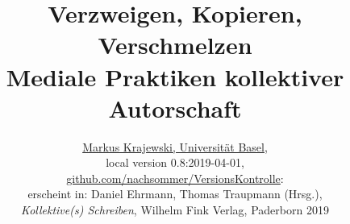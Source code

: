\documentclass[a4paper,11pt]{article}
\date{}
\newcommand{\anf}[1]{»#1«}
\begin{document}
%
% 
\title{Verzweigen, Kopieren, Verschmelzen\\
\Large Mediale Praktiken kollektiver Autorschaft}
\author{\href{http://gtm.mewi.unibas.ch}{Markus Krajewski, Universität Basel},\\[3mm]
local version 0.8:2019-04-01,\\
\href{https://github.com/nachsommer/VersionsKontrolle/tree/master/1.Fassung}{github.com/nachsommer/VersionsKontrolle}: \gitVer{}\\[3mm]
erscheint in: Daniel Ehrmann, Thomas Traupmann (Hrsg.),\\
\emph{Kollektive(s) Schreiben}, Wilhelm Fink Verlag, Paderborn 2019}
\maketitle
\tableofcontents
\newpage
%
\begin{comment}

Am Ende, nachdem die drei commits eingestellt sind, das gesamte Repositorium auf github mit einer DOI versehen, und zwar über Zenodo:
https://guides.github.com/activities/citable-code/

Header und Footer abgleichen

comments durchsehen...


In diesem Text den Dreischritt branch, diff, merge, zurückdrängen zugunsten von branch und merge, diff nur als kurze Abzweigung


\anf{Assistenzsysteme unterstützen Menschen im beruflichen und privaten Alltag. Sie verwenden vielfältige Sensoren, um Situationen zu erkennen und unterstützend in Handlungsabläufe einzugreifen und nutzen Wissen über die Struktur und die Bedeutung von Handlungen und Situationen. Sie können sowohl Demenzpatienten bei Alltagshandlungen unterstützen als auch Wissenschaftler bei der Auswahl und dem Einsatz von Analysemethoden, Sportler im Training oder Arbeiter bei der Montage. Methodisch setzen Assistenzsysteme vielfältige Techniken aus den Bereichen der Mensch-Maschine-Interaktion, der sensorbasierten Zustandsschätzung und der künstlichen Intelligenz ein.}\footnote{\href{https://www.informatik.uni-rostock.de/forschung/schwerpunkte/intelligente-assistenz/}{\texttt{www.informatik.uni-rostock.de/forschung/schwerpunkte/intelligente-assistenz/}}}


Viele Pfade und Pfadabhängigkeiten gilt es zu verfolgen.

dass der . Hier: die Unterschiede, und zwar die Unterschiede in den Texten.

Welche historischen Vergleiche? Die Korrektoren.

Darüber die Brücke zur Auto(r)Korrektur. Hier die Notwendigkeit, mimetischer Praktiken ins Spiel bringen...

\end{comment}
\end{document}
